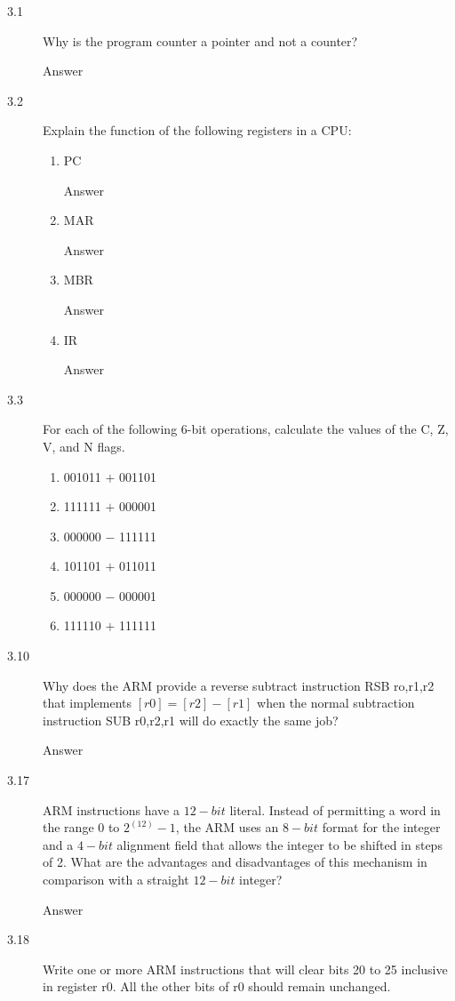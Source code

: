 \documentclass[letterpaper,10pt,titlepage]{article}
\begin{document}
\begin{description}
    \item[3.1] Why is the program counter a pointer and not a counter?
    
    Answer
    \item[3.2] Explain the function of the following registers in a CPU:
    \begin{enumerate}
        \item PC
        
        Answer
        \item MAR
        
        Answer
        \item MBR
        
        Answer
        \item IR
        
        Answer
    \end{enumerate}
    \item[3.3] For each of the following 6-bit operations, calculate the values of the C, Z, V, and N flags.
    \begin{enumerate}
        \item 001011 $+$ 001101
        \item 111111 $+$ 000001
        \item 000000 $-$ 111111
        \item 101101 $+$ 011011
        \item 000000 $-$ 000001
        \item 111110 $+$ 111111
    \end{enumerate}
    \item[3.10] Why does the ARM provide a reverse subtract instruction RSB ro,r1,r2 that implements $[r0] = [r2] - [r1]$ when the normal subtraction instruction SUB r0,r2,r1 will do exactly the same job?
    
    Answer
    \item[3.17] ARM instructions have a $12-bit$ literal. Instead of permitting a word in the range 0 to $2^(12) - 1$, the ARM uses an $8-bit$ format for the integer and a $4-bit$ alignment field that allows the integer to be shifted in steps of 2. What are the advantages and disadvantages of this mechanism in comparison with a straight $12-bit$ integer?
    
    Answer
    \item[3.18] Write one or more ARM instructions that will clear bits 20 to 25 inclusive in register r0. All the other bits of r0 should remain unchanged.
    

\end{description}
\end{document}
